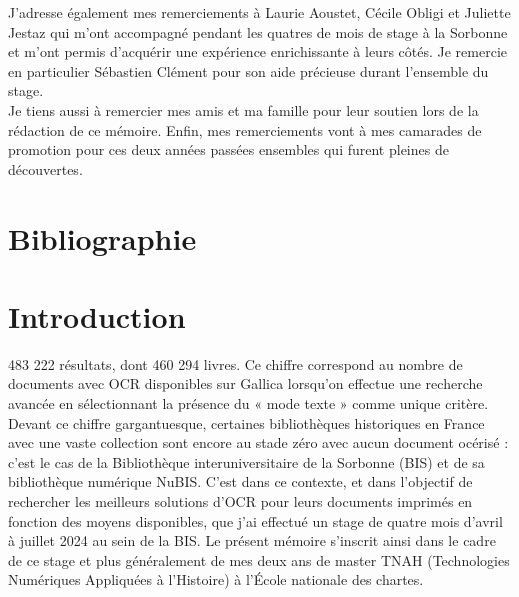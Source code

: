 \documentclass[a4paper,12pt,twoside]{book}
\begin{document}
J’adresse également mes remerciements à Laurie Aoustet, Cécile Obligi et Juliette Jestaz qui m’ont accompagné pendant les quatres de mois de stage à la Sorbonne et m’ont permis d’acquérir une expérience enrichissante à leurs côtés. Je remercie en particulier \mbox{Sébastien} Clément pour son aide précieuse durant l’ensemble du stage. \\

Je tiens aussi à remercier mes amis et ma famille pour leur soutien lors de la rédaction de ce mémoire. Enfin, mes remerciements vont à mes camarades de promotion pour ces deux années passées ensembles qui furent pleines de découvertes.\\
	\newpage{\pagestyle{empty}\cleardoublepage}
	
\chapter{Bibliographie}
\printbibliography[keyword=BIS, heading=Histoire de la BIS et du livre]
\printbibliography[keyword=OCRHTR, heading=OCR et HTR]


	
\chapter{Introduction}	
483 222 résultats, dont 460 294 livres. Ce chiffre correspond au nombre
de documents avec OCR disponibles sur Gallica lorsqu'on effectue une
recherche avancée en sélectionnant la présence du « mode texte » comme
unique critère. Devant ce chiffre gargantuesque, certaines bibliothèques
historiques en France avec une vaste collection sont encore au stade
zéro avec aucun document océrisé : c'est le cas de la Bibliothèque
interuniversitaire de la Sorbonne (BIS) et de sa bibliothèque numérique
NuBIS. C'est dans ce contexte, et dans l'objectif de rechercher les meilleurs solutions d'OCR  pour leurs documents imprimés en fonction des moyens disponibles, que j'ai effectué
un stage de quatre mois d'avril à juillet 2024 au sein de la BIS. Le
présent mémoire s'inscrit ainsi dans le cadre de ce stage et plus
généralement de mes deux ans de master TNAH (Technologies Numériques
Appliquées à l'Histoire) à l'École nationale des
chartes. \\
\end{document}

